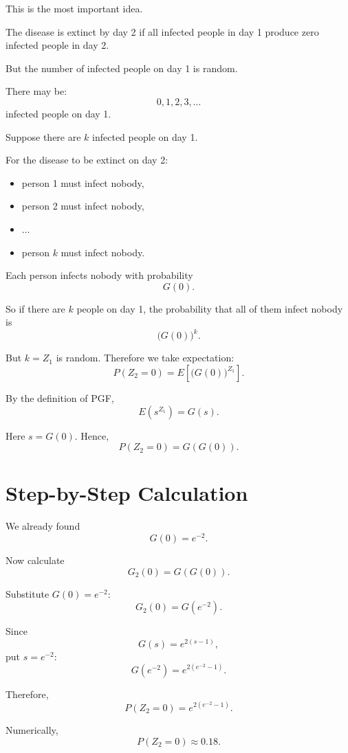 \documentclass[12pt]{article}
\begin{document}
This is the most important idea.

The disease is extinct by day 2 if all infected people in day 1 produce zero infected people in day 2.

But the number of infected people on day 1 is random.

There may be:
\[
0,1,2,3,\ldots
\]
infected people on day 1.

Suppose there are \(k\) infected people on day 1.

For the disease to be extinct on day 2:

\begin{itemize}
    \item person 1 must infect nobody,
    \item person 2 must infect nobody,
    \item \(\ldots\)
    \item person \(k\) must infect nobody.
\end{itemize}

Each person infects nobody with probability
\[
G(0).
\]

So if there are \(k\) people on day 1, the probability that all of them infect nobody is
\[
\bigl(G(0)\bigr)^k.
\]

But \(k=Z_1\) is random. Therefore we take expectation:
\[
P(Z_2=0)=E\left[\bigl(G(0)\bigr)^{Z_1}\right].
\]

By the definition of PGF,
\[
E(s^{Z_1})=G(s).
\]

Here \(s=G(0)\). Hence,
\[
P(Z_2=0)=G(G(0)).
\]

\begin{center}
\end{center}

\section{Step-by-Step Calculation}

We already found
\[
G(0)=e^{-2}.
\]

Now calculate
\[
G_2(0)=G(G(0)).
\]

Substitute \(G(0)=e^{-2}\):
\[
G_2(0)=G(e^{-2}).
\]

Since
\[
G(s)=e^{2(s-1)},
\]
put \(s=e^{-2}\):
\[
G(e^{-2})=e^{2(e^{-2}-1)}.
\]

Therefore,
\[
P(Z_2=0)=e^{2(e^{-2}-1)}.
\]

Numerically,
\[
P(Z_2=0)\approx 0.18.
\]
\end{document}
